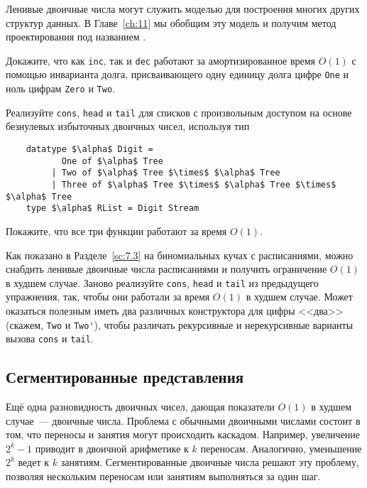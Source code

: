 Ленивые двоичные числа могут служить моделью для построения многих других
структур данных. В Главе~\ref{ch:11} мы обобщим эту модель и получим
метод проектирования под названием .

\begin{exercise}\label{ex:9.8}
  Докажите, что как \lstinline!inc!, так и \lstinline!dec! работают за
  амортизированное время $O(1)$ с помощью инварианта долга,
  присваивающего одну единицу долга цифре \lstinline!One! и ноль цифрам
  \lstinline!Zero! и \lstinline!Two!.
\end{exercise}

\begin{exercise}\label{ex:9.9}
  Реализуйте \lstinline!cons!, \lstinline!head! и \lstinline!tail! для
  списков с произвольным доступом на основе безнулевых избыточных
  двоичных чисел, используя тип
  \begin{lstlisting}
    datatype $\alpha$ Digit =
           One of $\alpha$ Tree
         | Two of $\alpha$ Tree $\times$ $\alpha$ Tree
         | Three of $\alpha$ Tree $\times$ $\alpha$ Tree $\times$ $\alpha$ Tree
    type $\alpha$ RList = Digit Stream
  \end{lstlisting}
  Покажите, что все три функции работают за время $O(1)$.
\end{exercise}

\begin{exercise}\label{ex:9.10}
  Как показано в Разделе~\ref{sc:7.3} на биномиальных кучах с
  расписаниями, можно снабдить ленивые двоичные числа расписаниями и
  получить ограничение $O(1)$ в худшем случае. Заново реализуйте
  \lstinline!cons!, \lstinline!head! и \lstinline!tail! из предыдущего
  упражнения, так, чтобы они работали за время $O(1)$ в худшем
  случае. Может оказаться полезным иметь два различных конструктора
  для цифры <<два>> (скажем, \lstinline!Two! и \lstinline!Two'!),
  чтобы различать рекурсивные и нерекурсивные варианты вызова \lstinline!cons!
  и \lstinline!tail!.
\end{exercise}

\subsection{Сегментированные представления}
\label{sc:9.2.4}

Ещё одна разновидность двоичных чисел, дающая показатели $O(1)$ в
худшем случае~---  двоичные
числа. Проблема с обычными двоичными числами состоит в том, что
переносы и занятия могут происходить каскадом. Например, увеличение
$2^k - 1$ приводит в двоичной арифметике к $k$ переносам. Аналогично,
уменьшение $2^k$ ведет к $k$ занятиям. Сегментированные двоичные числа
решают эту проблему, позволяя нескольким переносам или занятиям
выполняться за один шаг.

